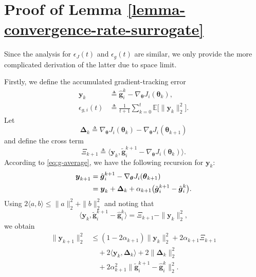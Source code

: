 \documentclass{IEEEtran}
\begin{document}
\section{Proof of Lemma \ref{lemma-convergence-rate-surrogate}}
\label{sec:proof-of-surrogate}
Since the analysis for $\epsilon_{J}(t)$ and $\epsilon_{g}(t)$ are similar, we only provide the more complicated derivation of the latter due to space limit. 

Firstly, we define the accumulated gradient-tracking error
\begin{equation}
\begin{aligned}
\boldsymbol{y}_k
&\triangleq \hat{\boldsymbol{g}}_i^k
-\nabla_{\boldsymbol{\theta}}J_i(\boldsymbol{\theta}_k), \\
\epsilon_{g,i}(t)
&\triangleq \frac{1}{t+1}\sum_{k=0}^{t}
\mathbb{E}\big[\|\boldsymbol{y}_k\|_2^2\big].
\end{aligned}
\label{eq:appD_epsgi_def}
\end{equation}
Let
\begin{equation}
 \boldsymbol{\Delta}_k\triangleq \nabla_{\boldsymbol{\theta}}J_i(\boldsymbol{\theta}_k)-\nabla_{\boldsymbol{\theta}}J_i(\boldsymbol{\theta}_{k+1})
\label{eq:appD_Deltag_def}
\end{equation}
and define the cross term
\begin{equation}
 \Xi_{k+1}\triangleq
 \big\langle
 \boldsymbol{y}_k,
 \tilde{\boldsymbol{g}}_i^{k+1}-\nabla_{\boldsymbol{\theta}}J_i(\boldsymbol{\theta}_k)
 \big\rangle.
\label{eq:appD_Xi_def}
\end{equation}
According to \eqref{eq:g-average}, we have the following recursion for $\boldsymbol{y}_k$: 
\begin{align}
 \boldsymbol{y}_{k+1}
 &=\hat{\boldsymbol{g}}_i^{k+1}-\nabla_{\boldsymbol{\theta}}J_i(\boldsymbol{\theta}_{k+1}) \notag\\
 &=\boldsymbol{y}_k+\boldsymbol{\Delta}_k+\alpha_{k+1}\big(\tilde{\boldsymbol{g}}_i^{k+1}-\hat{\boldsymbol{g}}_i^k\big).
\label{eq:appD_y_recursion}
\end{align}
Using $2\langle a,b\rangle\le \|a\|_2^2+\|b\|_2^2$ and noting that
\begin{equation}
 \big\langle \boldsymbol{y}_k,\tilde{\boldsymbol{g}}_i^{k+1}-\hat{\boldsymbol{g}}_i^k\big\rangle
 =\Xi_{k+1}-\|\boldsymbol{y}_k\|_2^2,
\end{equation}
we obtain
\begin{equation}
\begin{aligned}
 \|\boldsymbol{y}_{k+1}\|_2^2
 &\le (1-2\alpha_{k+1})\|\boldsymbol{y}_k\|_2^2
 +2\alpha_{k+1}\Xi_{k+1} \\
 &\quad +2\langle \boldsymbol{y}_k,\boldsymbol{\Delta}_k\rangle
 +2\|\boldsymbol{\Delta}_k\|_2^2 \\
 &\quad +2\alpha_{k+1}^2
 \big\|\tilde{\boldsymbol{g}}_i^{k+1}-\hat{\boldsymbol{g}}_i^k\big\|_2^2.
\end{aligned}
\label{eq:appD_y_square}
\end{equation}
\end{document}
